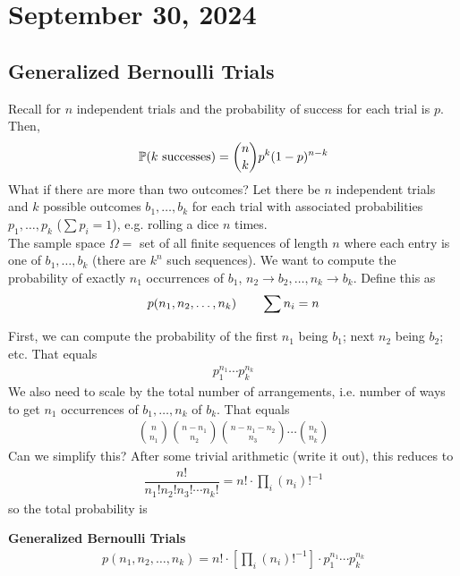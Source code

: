 \section{September 30, 2024}

\subsection{Generalized Bernoulli Trials}
Recall for $n$ independent trials and the probability of success for each trial is $p$. Then,
\begin{align}
    \mathbb{P}(k\text{ successes}) = \binom{n}{k} p^{k} (1-p)^{n-k}
\end{align}
What if there are more than two outcomes? Let there be $n$ independent trials and $k$ possible outcomes $b_1, \ldots, b_k$ for each trial with associated probabilities $p_1, \ldots, p_k$ ($\sum p_i = 1$), e.g. rolling a dice $n$ times.\\

The sample space $\Omega = $ set of all finite sequences of length $n$ where each entry is one of $b_1,\ldots,b_k$ (there are $k^n$ such sequences). We want to compute the probability of exactly $n_1$ occurrences of $b_1$, $n_2 \to b_2, \ldots, n_k\to b_k$. Define this as
\begin{align}
    p(n_1, n_2, \ldots, n_k) \qsp \sum n_i = n
\end{align}

First, we can compute the probability of the first $n_1$ being $b_1$; next $n_2$ being $b_2$; etc. That equals
\begin{align}
    p_1^{n_1} \cdots p_k^{n_k}
\end{align}
We also need to scale by the total number of arrangements, i.e. number of ways to get $n_1$ occurrences of $b_1, \ldots, n_k$ of $b_k$. That equals
\begin{align}
    \binom{n}{n_1}\binom{n-n_1}{n_2}\binom{n-n_1-n_2}{n_3}\cdots\binom{n_k}{n_k}
\end{align}
Can we simplify this? After some trivial arithmetic (write it out), this reduces to
\begin{align}
    \dfrac{n!}{n_1! n_2! n_3! \cdots n_k!} = n! \cdot \prod_i (n_i)!^{-1}
\end{align}
so the total probability is
\begin{definition}
    \textbf{Generalized Bernoulli Trials}
    \begin{align}
        p(n_1, n_2, \ldots, n_k) = n! \cdot \left[\prod_i (n_i)!^{-1}\right] \cdot p_1^{n_1} \cdots p_k^{n_k}
    \end{align}
\end{definition}

